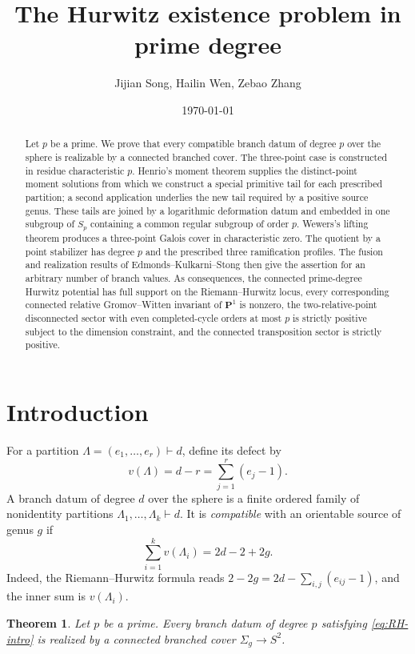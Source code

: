 \documentclass[11pt]{amsart}
\title[Hurwitz existence in prime degree]
{The Hurwitz existence problem in prime degree}
\author{Jijian Song, Hailin Wen, Zebao Zhang}
\date{\today}
\theoremstyle{plain}
\newtheorem{theorem}{Theorem}[section]
\theoremstyle{definition}
\numberwithin{equation}{section}
\begin{document}
\begin{abstract}
Let $p$ be a prime.  We prove that every compatible branch datum of degree
$p$ over the sphere is realizable by a connected branched cover.  The
three-point case is constructed in residue characteristic $p$.  Henrio's
moment theorem supplies the distinct-point moment solutions from which we
construct a special primitive tail for each prescribed partition; a second
application underlies the new tail required by a positive source genus.
These tails are joined by a logarithmic deformation datum and embedded in
one subgroup of $S_p$ containing a common regular subgroup of order $p$.
Wewers's lifting theorem produces a three-point Galois cover in
characteristic zero.  The quotient by a point stabilizer has degree $p$ and
the prescribed three ramification profiles.  The fusion and realization
results of Edmonds--Kulkarni--Stong then give the assertion for an arbitrary
number of branch values.  As consequences, the connected prime-degree
Hurwitz potential has full support on the Riemann--Hurwitz locus, every
corresponding connected relative Gromov--Witten invariant of $\mathbf P^1$
is nonzero, the two-relative-point disconnected sector with even
completed-cycle orders at most $p$ is strictly positive subject to the
dimension constraint, and the connected transposition sector is strictly
positive.
\end{abstract}
\maketitle

\section{Introduction}

For a partition $\Lambda=(e_1,\ldots,e_r)\vdash d$, define its defect by
\[
 v(\Lambda)=d-r=\sum_{j=1}^{r}(e_j-1).
\]
A branch datum of degree $d$ over the sphere is a finite ordered family of
nonidentity partitions $\Lambda_1,\ldots,\Lambda_k\vdash d$.  It is
\emph{compatible} with an orientable source of genus $g$ if
\begin{equation}\label{eq:RH-intro}
 \sum_{i=1}^{k}v(\Lambda_i)=2d-2+2g.
\end{equation}
Indeed, the Riemann--Hurwitz formula reads
$2-2g=2d-\sum_{i,j}(e_{ij}-1)$, and the inner sum is
$v(\Lambda_i)$.

\begin{theorem}\label{thm:main}
Let $p$ be a prime.  Every branch datum of degree $p$ satisfying
\eqref{eq:RH-intro} is realized by a connected branched cover
$\Sigma_g\to S^2$.
\end{theorem}
\end{document}
